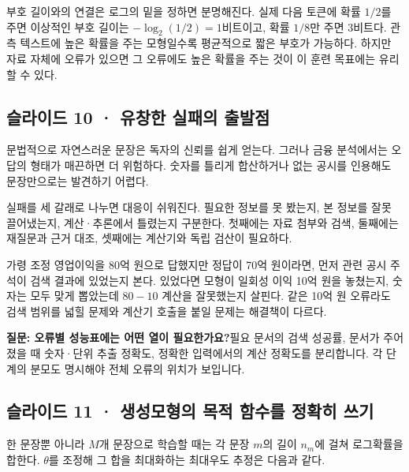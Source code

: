 \documentclass[11pt,a4paper]{article}
\begin{document}
부호 길이와의 연결은 로그의 밑을 정하면 분명해진다. 실제 다음 토큰에 확률 $1/2$를 주면 이상적인 부호 길이는 $-\log_2(1/2)=1$비트이고, 확률 $1/8$만 주면 3비트다. 관측 텍스트에 높은 확률을 주는 모형일수록 평균적으로 짧은 부호가 가능하다. 하지만 자료 자체에 오류가 있으면 그 오류에도 높은 확률을 주는 것이 이 훈련 목표에는 유리할 수 있다.\par

\subsection{슬라이드 10 · 유창한 실패의 출발점}
문법적으로 자연스러운 문장은 독자의 신뢰를 쉽게 얻는다. 그러나 금융 분석에서는 오답의 형태가 매끈하면 더 위험하다. 숫자를 틀리게 합산하거나 없는 공시를 인용해도 문장만으로는 발견하기 어렵다.\par

실패를 세 갈래로 나누면 대응이 쉬워진다. 필요한 정보를 못 봤는지, 본 정보를 잘못 끌어냈는지, 계산·추론에서 틀렸는지 구분한다. 첫째에는 자료 첨부와 검색, 둘째에는 재질문과 근거 대조, 셋째에는 계산기와 독립 검산이 필요하다.\par

가령 조정 영업이익을 80억 원으로 답했지만 정답이 70억 원이라면, 먼저 관련 공시 주석이 검색 결과에 있었는지 본다. 있었다면 모형이 일회성 이익 10억 원을 놓쳤는지, 숫자는 모두 맞게 뽑았는데 $80-10$ 계산을 잘못했는지 살핀다. 같은 10억 원 오류라도 검색 범위를 넓힐 문제와 계산기 호출을 붙일 문제는 해결책이 다르다.\par

\begin{samepage}\par\medskip\noindent\textbf{질문: 오류별 성능표에는 어떤 열이 필요한가요?}\quad 필요 문서의 검색 성공률, 문서가 주어졌을 때 숫자·단위 추출 정확도, 정확한 입력에서의 계산 정확도를 분리합니다. 각 단계의 분모도 명시해야 전체 오류의 위치가 보입니다.\par\end{samepage}

\subsection{슬라이드 11 · 생성모형의 목적 함수를 정확히 쓰기}
한 문장뿐 아니라 $M$개 문장으로 학습할 때는 각 문장 $m$의 길이 $n_m$에 걸쳐 로그확률을 합한다. $\theta$를 조정해 그 합을 최대화하는 최대우도 추정은 다음과 같다.\par
\end{document}
